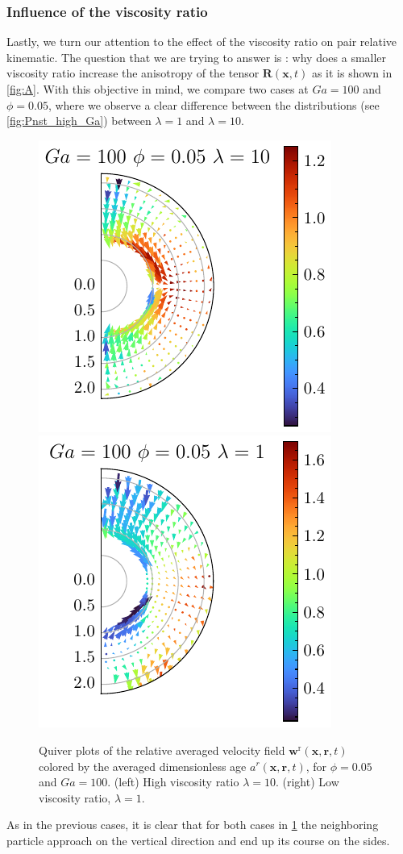\subsubsection*{Influence of the viscosity ratio}

Lastly, we turn our attention to the effect of the viscosity ratio on pair relative kinematic.
The question that we are trying to answer is : why does a smaller viscosity ratio increase the anisotropy of the tensor $\textbf{R}(\textbf{x},t)$ as it is shown in \ref{fig:A}. 
With this objective in mind, we compare two cases at $Ga = 100$ and $\phi =0.05$, where we observe a clear difference between the distributions (see \ref{fig:Pnst_high_Ga}) between $\lambda = 1$ and $\lambda = 10$.
\begin{figure}[h!]
    \centering
    \includegraphics[height=0.35\textwidth]{image/HOMOGENEOUS_NEW/Dist/U_rel_l_10_Ga_100_PHI_5.pdf}
    \includegraphics[height=0.35\textwidth]{image/HOMOGENEOUS_NEW/Dist/U_rel_l_1_Ga_100_PHI_5.pdf}
    \caption{Quiver plots of the relative averaged velocity field $\textbf{w}^\text{r}(\textbf{x},\textbf{r},t)$ colored by the averaged dimensionless age $a^r(\textbf{x},\textbf{r},t)$, for $\phi = 0.05$ and $Ga = 100$. 
    (left) High viscosity ratio $\lambda = 10$.
    (right) Low viscosity ratio, $\lambda = 1$. }
    \label{fig:Why_l_matter}
\end{figure}
As in the previous cases, it is clear that for both cases in \ref{fig:Why_l_matter} the neighboring particle approach on the vertical direction and end up its course on the sides.
